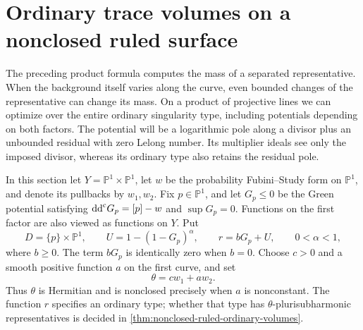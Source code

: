 \section{Ordinary trace volumes on a nonclosed ruled surface}
\label{sec:nonclosed-ruled-trace-masses}

The preceding product formula computes the mass of a separated representative. When the background itself varies along the curve, even bounded changes of the representative can change its mass. On a product of projective lines we can optimize over the entire ordinary singularity type, including potentials depending on both factors. The potential will be a logarithmic pole along a divisor plus an unbounded residual with zero Lelong number. Its multiplier ideals see only the imposed divisor, whereas its ordinary type also retains the residual pole.

In this section let $Y=\mathbb P^1\times\mathbb P^1$, let $w$ be the probability Fubini--Study form on $\mathbb P^1$, and denote its pullbacks by $w_1,w_2$. Fix $p\in\mathbb P^1$, and let $G_p\leq0$ be the Green potential satisfying $\mathrm{dd}^{\mathrm{c}} G_p=[p]-w$ and $\sup G_p=0$. Functions on the first factor are also viewed as functions on $Y$. Put
\[
 D=\{p\}\times\mathbb P^1,\qquad
 U=1-(1-G_p)^\alpha,\qquad r=bG_p+U,
 \qquad 0<\alpha<1,
\]
where $b\geq0$. The term $bG_p$ is identically zero when $b=0$. Choose $c>0$ and a smooth positive function $a$ on the first curve, and set
\begin{equation}\label{eq:ruled-trace-background}
 \theta=cw_1+aw_2.
\end{equation}
Thus $\theta$ is Hermitian and is nonclosed precisely when $a$ is nonconstant. The function $r$ specifies an ordinary type; whether that type has $\theta$-plurisubharmonic representatives is decided in \cref{thm:nonclosed-ruled-ordinary-volumes}.

